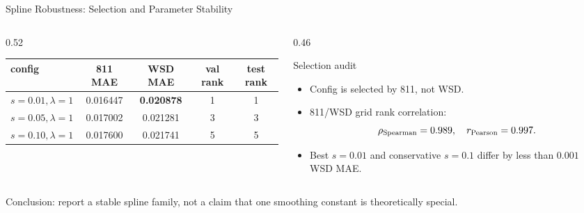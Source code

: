 \documentclass[fontset=fandol,aspectratio=169,10pt]{ctexbeamer}
\newcommand{\smallnote}[1]{{\scriptsize\color{tdltGray}#1}}
\begin{document}
\begin{frame}{Spline Robustness: Selection and Parameter Stability}
  \begin{columns}[T,onlytextwidth]
    \begin{column}{0.52\textwidth}
      \begin{table}
        \centering
        \scriptsize
        \begin{tabular}{lcccc}
          \toprule
          config & 811 MAE & WSD MAE & val rank & test rank\\
          \midrule
          \(s=0.01,\lambda=1\) & 0.016447 & \textbf{0.020878} & 1 & 1\\
          \(s=0.05,\lambda=1\) & 0.017002 & 0.021281 & 3 & 3\\
          \(s=0.10,\lambda=1\) & 0.017600 & 0.021741 & 5 & 5\\
          \bottomrule
        \end{tabular}
      \end{table}
    \end{column}
    \begin{column}{0.46\textwidth}
      \begin{block}{Selection audit}
        \begin{itemize}
          \item Config is selected by 811, not WSD.
          \item 811/WSD grid rank correlation:
          \[
            \rho_{\rm Spearman}=0.989,\quad r_{\rm Pearson}=0.997.
          \]
          \item Best \(s=0.01\) and conservative \(s=0.1\) differ by less than \(0.001\) WSD MAE.
        \end{itemize}
      \end{block}
    \end{column}
  \end{columns}
  \smallnote{Conclusion: report a stable spline family, not a claim that one smoothing constant is theoretically special.}
\end{frame}
\end{document}
